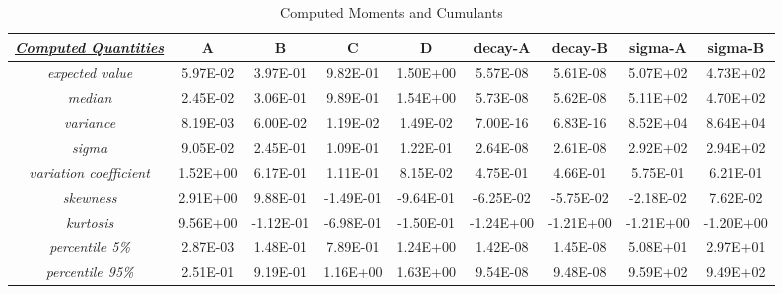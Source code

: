\begin{landscape}
\begin{table}[h!]
\centering
\caption{Computed Moments and Cumulants}
\label{ScalarMoments}
\begin{tabular}{|c|c|c|c|c|c|c|c|c|}
\hline
{\ul \textit{\textbf{Computed Quantities}}} & \textbf{A} & \textbf{B} & \textbf{C} & \textbf{D} & \textbf{decay-A} & \textbf{decay-B} & \textbf{sigma-A} & \textbf{sigma-B} \\ \hline
\textit{expected value}                     & 5.97E-02   & 3.97E-01   & 9.82E-01   & 1.50E+00   & 5.57E-08         & 5.61E-08         & 5.07E+02         & 4.73E+02         \\ \hline
\textit{median}                             & 2.45E-02   & 3.06E-01   & 9.89E-01   & 1.54E+00   & 5.73E-08         & 5.62E-08         & 5.11E+02         & 4.70E+02         \\ \hline
\textit{variance}                           & 8.19E-03   & 6.00E-02   & 1.19E-02   & 1.49E-02   & 7.00E-16         & 6.83E-16         & 8.52E+04         & 8.64E+04         \\ \hline
\textit{sigma}                              & 9.05E-02   & 2.45E-01   & 1.09E-01   & 1.22E-01   & 2.64E-08         & 2.61E-08         & 2.92E+02         & 2.94E+02         \\ \hline
\textit{variation coefficient}              & 1.52E+00   & 6.17E-01   & 1.11E-01   & 8.15E-02   & 4.75E-01         & 4.66E-01         & 5.75E-01         & 6.21E-01         \\ \hline
\textit{skewness}                           & 2.91E+00   & 9.88E-01   & -1.49E-01  & -9.64E-01  & -6.25E-02        & -5.75E-02        & -2.18E-02        & 7.62E-02         \\ \hline
\textit{kurtosis}                           & 9.56E+00   & -1.12E-01  & -6.98E-01  & -1.50E-01  & -1.24E+00        & -1.21E+00        & -1.21E+00        & -1.20E+00        \\ \hline
\textit{percentile 5\%}                     & 2.87E-03   & 1.48E-01   & 7.89E-01   & 1.24E+00   & 1.42E-08         & 1.45E-08         & 5.08E+01         & 2.97E+01         \\ \hline
\textit{percentile 95\%}                    & 2.51E-01   & 9.19E-01   & 1.16E+00   & 1.63E+00   & 9.54E-08         & 9.48E-08         & 9.59E+02         & 9.49E+02         \\ \hline
\end{tabular}
\end{table}

\end{landscape}
